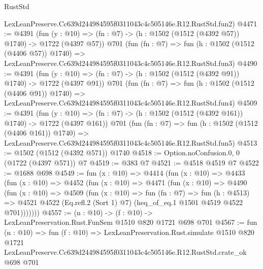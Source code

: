 \begin{lexlean}{RustStd}
\begin{coremodule}
    LexLeanPreserve.Cc639d244984595f0311043c4c505146e.R12.RustStd.fun2)
@4471 := @4391
    (fun (y : @10) => (fn : @7) -> (h : @1502 (@1512 (@4392 @57)) @1740) -> @1722 (@4397 @57))
    @701
    (fun (fn : @7) =>
    fun (h : @1502 (@1512 (@4406 @57)) @1740) =>
    LexLeanPreserve.Cc639d244984595f0311043c4c505146e.R12.RustStd.fun3)
@4490 := @4391
    (fun (y : @10) => (fn : @7) -> (h : @1502 (@1512 (@4392 @91)) @1740) -> @1722 (@4397 @91))
    @701
    (fun (fn : @7) =>
    fun (h : @1502 (@1512 (@4406 @91)) @1740) =>
    LexLeanPreserve.Cc639d244984595f0311043c4c505146e.R12.RustStd.fun4)
@4509 := @4391
    (fun (y : @10) => (fn : @7) -> (h : @1502 (@1512 (@4392 @161)) @1740) -> @1722 (@4397 @161))
    @701
    (fun (fn : @7) =>
    fun (h : @1502 (@1512 (@4406 @161)) @1740) =>
    LexLeanPreserve.Cc639d244984595f0311043c4c505146e.R12.RustStd.fun5)
@4513 := @1502 (@1512 (@4392 @571)) @1740
@4518 := Option.noConfusion.{0, 0} (@1722 (@4397 @571)) @7
@4519 := @383 @7
@4521 := @4518 @4519 @7
@4522 := @1688 @698
@4549 := fun (x : @10) =>
  @4414
    (fun (x : @10) =>
    @4433
      (fun (x : @10) =>
      @4452
        (fun (x : @10) =>
        @4471
          (fun (x : @10) =>
          @4490
            (fun (x : @10) =>
            @4509
              (fun (x : @10) =>
              fun (fn : @7) =>
              fun (h : @4513) =>
              @4521 @4522 (Eq.refl.{2} (Sort 1) @7) (heq_of_eq.{1} @1501 @4519 @4522 @701)))))))
@4557 := (n : @10) -> (f : @10) -> LexLeanPreservation.Rust.FunSem @1510 @820 @1721 @698 @701
@4567 := fun (n : @10) =>
  fun (f : @10) =>
  LexLeanPreservation.Rust.simulate
    @1510
    @820
    @1721
    LexLeanPreserve.Cc639d244984595f0311043c4c505146e.R12.RustStd.crate_ok
    @698
    @701
\end{coremodule}
\end{lexlean}
